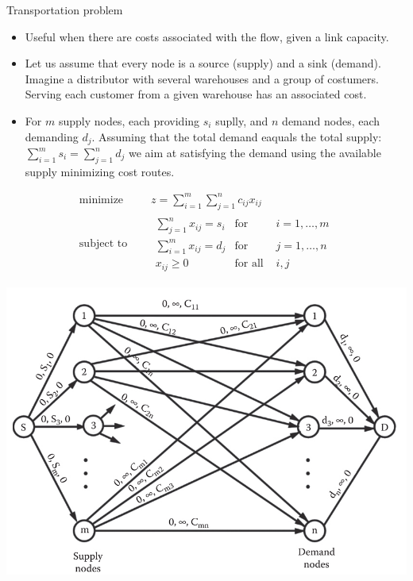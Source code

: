 \documentclass[c]{beamer}
\begin{document}
\begin{frame}{Transportation problem}
\begin{itemize}

  \item Useful when there are costs associated with the flow, given a link capacity.

  \item Let us assume that every node is a source (supply) and a sink (demand). Imagine a distributor with several warehouses and a group of costumers. Serving each customer from a given warehouse has an associated cost.

  \item For $m$ supply nodes, each providing $s_i$ suplly,  and $n$ demand nodes, each demanding $d_j$. Assuming that the total demand eaquals the total supply: $\sum_{i=1}^m s_i = \sum_{j=1}^n d_j$ we aim at satisfying the demand using the available supply minimizing cost routes.

\end{itemize}
\end{frame}

\begin{frame}
  \begin{equation*}
    \begin{aligned}
      \text{minimize } \quad & z = \sum_{i=1}^m \sum_{j=1}^n c_{ij}x_{ij} \\
      \text{subject to }\quad &
      \begin{array}{rcl}
        \sum_{j=1}^n x_{ij}= s_i&\text{for }& i=1,\ldots,m \\
        \sum_{i=1}^m x_{ij} = d_j &\text{for }& j=1,\ldots,n \\
        x_{ij} \geq 0 & \text{for all } & i,j
      \end{array}
    \end{aligned}
  \end{equation*}
  \begin{center}
    \includegraphics[width=0.6\linewidth]{../figures/transportationproblem.png}
  \end{center}
\end{frame}
\end{document}
